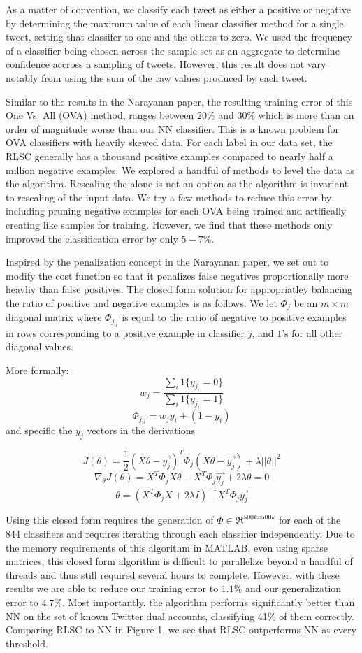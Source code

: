 \documentclass[10pt, conference, compsocconf]{IEEEtran}
\begin{document}
As a matter of convention, we classify each tweet as either a positive
or negative by determining the maximum value of each linear classifier
method for a single tweet, setting that classifer to one and the
others to zero.  We used the frequency of a classifier being chosen
across the sample set as an aggregate to determine confidence accross
a sampling of tweets.  However, this result does not vary notably from
using the sum of the raw values produced by each tweet.
  
Similar to the results in the Narayanan paper, the resulting training
error of this One Vs. All (OVA) method, ranges between 20\% and 30\%
which is more than an order of magnitude worse than our NN classifier.
This is a known problem for OVA classifiers with heavily skewed
data. For each label in our data set, the RLSC generally has a
thousand positive examples compared to nearly half a million negative
examples. We explored a handful of methods to level the data as the
algorithm.  Rescaling the alone is not an option as the algorithm is
invariant to rescaling of the input data. We try a few methods
\cite{Schapire} to reduce this error by including pruning \cite{Dekel}
negative examples for each OVA being trained and artifically creating
like samples for training.  However, we find that these methods only
improved the classification error by only $5-7\%$.

Inspired by the penalization concept in the Narayanan paper, we set
out to modify the cost function so that it penalizes false negatives
proportionally more heavliy than false positives. The closed form
solution for appropriatley balancing the ratio of positive and
negative examples is as follows. We let $\Phi_j$ be an $m \times m$
diagonal matrix where $\Phi_{j_{ii}}$ is equal to the ratio of
negative to positive examples in rows corresponding to a positive
example in classifier $j$, and $1$'s for all other diagonal values.

More formally:
$$w_{j} = \frac{\sum_{i}{1\{y_{j_i}=0\}}}{\sum_{i}{1\{y_{j_i}=1\}}}$$
$$\Phi_{j_{ii}} = w_{j}y_{i} + (1-y_i)$$
and specific the $y_j$ vectors in the derivations

$$J(\theta) = \frac{1}{2} (X\theta - \vec{y_j})^T \Phi_j (X\theta-\vec{y_j}) + \lambda ||\theta||^2 $$
$$ \nabla_\theta J(\theta) = X^T \Phi_j X \theta -X^T \Phi_j \vec{y_j} +2 \lambda \theta = 0$$
$$ \theta= (X^T\Phi_j X+2 \lambda I)^{-1} X^T \Phi_j \vec{y_j}$$

Using this closed form requires the generation of $\Phi \in \Re^{500k
  x 500k}$ for each of the 844 classifiers and requires iterating
through each classifier independently.  Due to the memory requirements
of this algorithm in MATLAB, even using sparse matrices, this closed
form algorithm is difficult to parallelize beyond a handful of threads
and thus still required several hours to complete.  However, with
these results we are able to reduce our training error to $1.1\%$ and
our generalization error to $4.7\%$. Most importantly, the algorithm
performs significantly better than NN on the set of known Twitter dual
accounts, classifying 41\% of them correctly. Comparing RLSC to NN in
Figure 1, we see that RLSC outperforms NN at every threshold.
\end{document}

